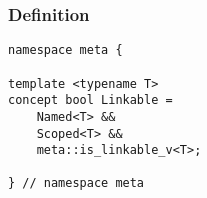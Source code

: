 
\subsubsection{Definition}

\begin{verbatim}
namespace meta {

template <typename T>
concept bool Linkable =
	Named<T> &&
	Scoped<T> &&
	meta::is_linkable_v<T>;

} // namespace meta
\end{verbatim}
